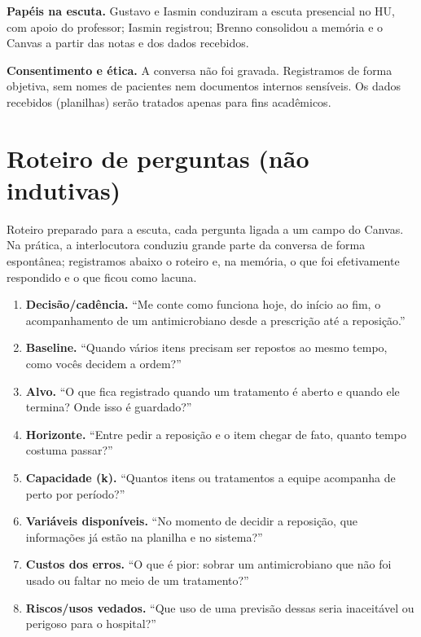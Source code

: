 \documentclass[11pt,a4paper]{article}
\begin{document}
\textbf{Papéis na escuta.} Gustavo e Iasmin conduziram a escuta presencial no HU, com apoio do professor; Iasmin registrou; Brenno consolidou a memória e o Canvas a partir das notas e dos dados recebidos.

\textbf{Consentimento e ética.} A conversa não foi gravada. Registramos de forma objetiva, sem nomes de pacientes nem documentos internos sensíveis. Os dados recebidos (planilhas) serão tratados apenas para fins acadêmicos.

\section{Roteiro de perguntas (não indutivas)}

Roteiro preparado para a escuta, cada pergunta ligada a um campo do Canvas. Na prática, a interlocutora conduziu grande parte da conversa de forma espontânea; registramos abaixo o roteiro e, na memória, o que foi efetivamente respondido e o que ficou como lacuna.

\begin{enumerate}
    \item \textbf{Decisão/cadência.} ``Me conte como funciona hoje, do início ao fim, o acompanhamento de um antimicrobiano desde a prescrição até a reposição.''
    \item \textbf{Baseline.} ``Quando vários itens precisam ser repostos ao mesmo tempo, como vocês decidem a ordem?''
    \item \textbf{Alvo.} ``O que fica registrado quando um tratamento é aberto e quando ele termina? Onde isso é guardado?''
    \item \textbf{Horizonte.} ``Entre pedir a reposição e o item chegar de fato, quanto tempo costuma passar?''
    \item \textbf{Capacidade (k).} ``Quantos itens ou tratamentos a equipe acompanha de perto por período?''
    \item \textbf{Variáveis disponíveis.} ``No momento de decidir a reposição, que informações já estão na planilha e no sistema?''
    \item \textbf{Custos dos erros.} ``O que é pior: sobrar um antimicrobiano que não foi usado ou faltar no meio de um tratamento?''
    \item \textbf{Riscos/usos vedados.} ``Que uso de uma previsão dessas seria inaceitável ou perigoso para o hospital?''
\end{enumerate}
\end{document}

